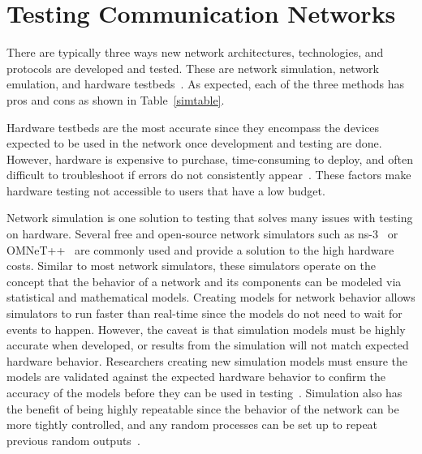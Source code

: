 \section{Testing Communication Networks} %
There are typically three ways new network architectures, technologies, and protocols are developed and tested. These are network simulation, network emulation, and hardware testbeds~\cite{simulation_emulation}.
As expected, each of the three methods has pros and cons as shown in Table~\ref{simtable}.\par
Hardware testbeds are the most accurate since they encompass the devices expected to be used in the network once development and testing are done.
However, hardware is expensive to purchase, time-consuming to deploy, and often difficult to troubleshoot if errors do not consistently appear~\cite{nsclick}.
These factors make hardware testing not accessible to users that have a low budget.\par
Network simulation is one solution to testing that solves many issues with testing on hardware.
Several free and open-source network simulators such as ns-3~\cite{ns3} or OMNeT++~\cite{omnet++} are commonly used and provide a solution to the high hardware costs.
Similar to most network simulators, these simulators operate on the concept that the behavior of a network and its components can be modeled via statistical and mathematical models.
Creating models for network behavior allows simulators to run faster than real-time since the models do not need to wait for events to happen.
However, the caveat is that simulation models must be highly accurate when developed, or results from the simulation will not match expected hardware behavior.
Researchers creating new simulation models must ensure the models are validated against the expected hardware behavior to confirm the accuracy of the models before they can be used in testing~\cite{omnet_manager}.
Simulation also has the benefit of being highly repeatable since the behavior of the network can be more tightly controlled, and any random processes can be set up to repeat previous random outputs~\cite{simulation_emulation}.\par
